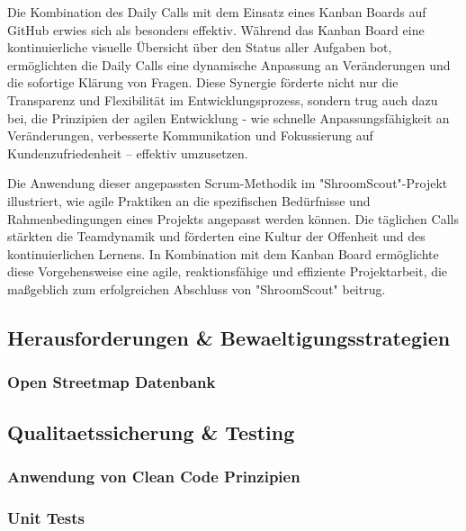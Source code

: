 \documentclass[../main.tex]{subfiles}
\begin{document}
Die Kombination des Daily Calls mit dem Einsatz eines Kanban Boards auf GitHub erwies sich als besonders effektiv. Während das Kanban Board eine kontinuierliche 
visuelle Übersicht über den Status aller Aufgaben bot, ermöglichten die Daily Calls eine dynamische Anpassung an Veränderungen und die sofortige Klärung von 
Fragen. Diese Synergie förderte nicht nur die Transparenz und Flexibilität im Entwicklungsprozess, sondern trug auch dazu bei, die Prinzipien der agilen Entwicklung 
- wie schnelle Anpassungsfähigkeit an Veränderungen, verbesserte Kommunikation und Fokussierung auf Kundenzufriedenheit – effektiv umzusetzen.

Die Anwendung dieser angepassten Scrum-Methodik im "ShroomScout"-Projekt illustriert, wie agile Praktiken an die spezifischen Bedürfnisse und Rahmenbedingungen 
eines Projekts angepasst werden können. Die täglichen Calls stärkten die Teamdynamik und förderten eine Kultur der Offenheit und des kontinuierlichen Lernens. 
In Kombination mit dem Kanban Board ermöglichte diese Vorgehensweise eine agile, reaktionsfähige und effiziente Projektarbeit, die maßgeblich zum erfolgreichen 
Abschluss von "ShroomScout" beitrug.

\subsection{Herausforderungen \& Bewaeltigungsstrategien} %
\subsubsection{Open Streetmap Datenbank}

\subsection{Qualitaetssicherung \& Testing} %
\subsubsection{Anwendung von Clean Code Prinzipien}
\subsubsection{Unit Tests}
\end{document}

